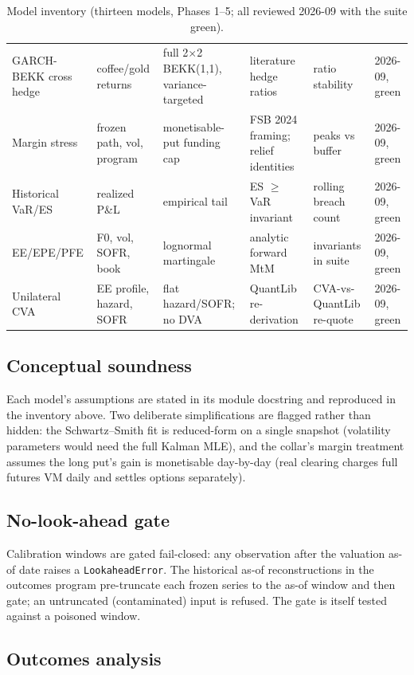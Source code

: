 \documentclass[11pt,a4paper]{article}
\begin{document}
\begin{table}[h!]
\begin{tabular}{p{2.7cm}p{2.5cm}p{3.4cm}p{3.2cm}p{2.7cm}p{1.5cm}}
GARCH-BEKK cross hedge & coffee/gold returns & full 2$\times$2 BEKK(1,1), variance-targeted & literature hedge ratios & ratio stability & 2026-09, green \\
Margin stress & frozen path, vol, program & monetisable-put funding cap & FSB 2024 framing; relief identities & peaks vs buffer & 2026-09, green \\
Historical VaR/ES & realized P\&L & empirical tail & ES $\geq$ VaR invariant & rolling breach count & 2026-09, green \\
EE/EPE/PFE & F0, vol, SOFR, book & lognormal martingale & analytic forward MtM & invariants in suite & 2026-09, green \\
Unilateral CVA & EE profile, hazard, SOFR & flat hazard/SOFR; no DVA & QuantLib re-derivation & CVA-vs-QuantLib re-quote & 2026-09, green \\
\bottomrule
\end{tabular}
\caption{Model inventory (thirteen models, Phases 1--5; all reviewed 2026-09 with the suite green).}
\end{table}

\subsection{Conceptual soundness}

Each model's assumptions are stated in its module docstring and reproduced
in the inventory above. Two deliberate simplifications are flagged rather
than hidden: the Schwartz--Smith fit is reduced-form on a single snapshot
(volatility parameters would need the full Kalman MLE), and the collar's
margin treatment assumes the long put's gain is monetisable day-by-day
(real clearing charges full futures VM daily and settles options
separately).

\subsection{No-look-ahead gate}

Calibration windows are gated fail-closed: any observation after the
valuation as-of date raises a \texttt{LookaheadError}. The historical
as-of reconstructions in the outcomes program pre-truncate each frozen
series to the as-of window and then gate; an untruncated (contaminated)
input is refused. The gate is itself tested against a poisoned window.

\subsection{Outcomes analysis}
\end{document}
